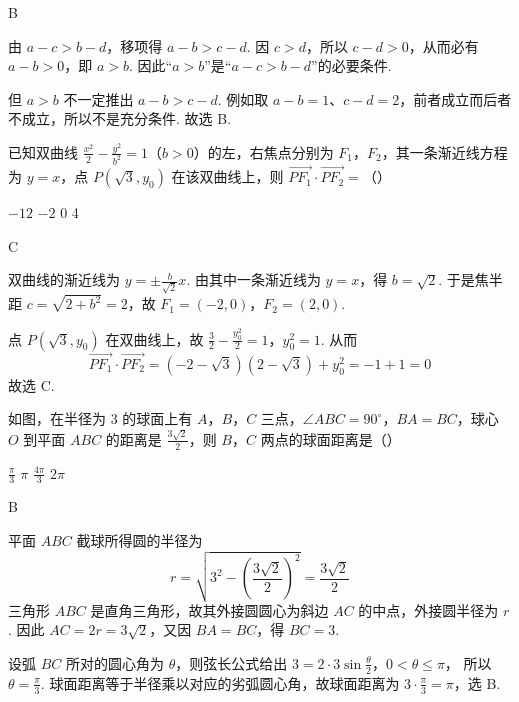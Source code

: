 \begin{answer}
B
\end{answer}

\begin{solution}
由 \(a-c>b-d\)，移项得 \(a-b>c-d\). 因 \(c>d\)，所以 \(c-d>0\)，从而必有
\(a-b>0\)，即 \(a>b\). 因此“\(a>b\)”是“\(a-c>b-d\)”的必要条件.

但 \(a>b\) 不一定推出 \(a-b>c-d\). 例如取 \(a-b=1\)、\(c-d=2\)，前者成立而后者不成立，所以不是充分条件. 故选 B.
\end{solution}

\begin{problem}
已知双曲线 \(\frac{x^2}{2} - \frac{y^2}{b^2} = 1\)（\(b > 0\)）的左，右焦点分别为 \(F_1\)，\(F_2\)，其一条渐近线方程为 \(y = x\)，点 \(P(\sqrt{3}, y_0)\) 在该双曲线上，则 \(\overrightarrow{PF_1} \cdot \overrightarrow{PF_2} =\)（\quad）

\choices
    {\(-12\)}
    {\(-2\)}
    {0}
    {4}
\end{problem}

\begin{answer}
C
\end{answer}

\begin{solution}
双曲线的渐近线为 \(y=\pm\frac{b}{\sqrt2}x\). 由其中一条渐近线为 \(y=x\)，得
\(b=\sqrt2\). 于是焦半距
\(c=\sqrt{2+b^2}=2\)，故
\(F_1=(-2,0)\)，\(F_2=(2,0)\).

点 \(P(\sqrt3,y_0)\) 在双曲线上，故
\(\frac{3}{2}-\frac{y_0^2}{2}=1\)，\(y_0^2=1\).
从而
\[
\overrightarrow{PF_1}\cdot\overrightarrow{PF_2}
=(-2-\sqrt3)(2-\sqrt3)+y_0^2=-1+1=0
\]
故选 C.
\end{solution}

\begin{problem}
如图，在半径为 3 的球面上有 \(A\)，\(B\)，\(C\) 三点，\(\angle ABC = 90^{\circ}\)，\(BA = BC\)，球心 \(O\) 到平面 \(ABC\) 的距离是 \(\frac{3\sqrt{2}}{2}\)，则 \(B\)，\(C\) 两点的球面距离是（\quad）


\choices
    {\(\frac{\pi}{3}\)}
    {\(\pi\)}
    {\(\frac{4\pi}{3}\)}
    {\(2\pi\)}
\end{problem}

\begin{answer}
B
\end{answer}

\begin{solution}
平面 \(ABC\) 截球所得圆的半径为
\[
r=\sqrt{3^2-\left(\frac{3\sqrt2}{2}\right)^2}=\frac{3\sqrt2}{2}
\]
三角形 \(ABC\) 是直角三角形，故其外接圆圆心为斜边 \(AC\) 的中点，外接圆半径为 \(r\). 因此
\(AC=2r=3\sqrt2\)，又因 \(BA=BC\)，得 \(BC=3\).

设弧 \(BC\) 所对的圆心角为 \(\theta\)，则弦长公式给出
\(3=2\cdot3\sin\frac{\theta}{2}\)，\(0<\theta\le\pi\)，
所以 \(\theta=\frac{\pi}{3}\). 球面距离等于半径乘以对应的劣弧圆心角，故球面距离为
\(3\cdot\frac{\pi}{3}=\pi\)，选 B.
\end{solution}

